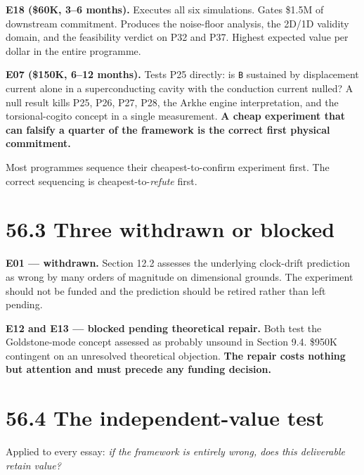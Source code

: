 \documentclass[
  11pt]{report}
\begin{document}
\textbf{E18 (\$60K, 3--6 months).} Executes all six simulations. Gates
\$1.5M of downstream commitment. Produces the noise-floor analysis, the
2D/1D validity domain, and the feasibility verdict on P32 and P37.
Highest expected value per dollar in the entire programme.

\textbf{E07 (\$150K, 6--12 months).} Tests P25 directly: is \texttt{B}
sustained by displacement current alone in a superconducting cavity with
the conduction current nulled? A null result kills P25, P26, P27, P28,
the Arkhe engine interpretation, and the torsional-cogito concept in a
single measurement. \textbf{A cheap experiment that can falsify a
quarter of the framework is the correct first physical commitment.}

Most programmes sequence their cheapest-to-confirm experiment first. The
correct sequencing is cheapest-to-\emph{refute} first.

\hypertarget{three-withdrawn-or-blocked}{%
\section{56.3 Three withdrawn or
blocked}\label{three-withdrawn-or-blocked}}

\textbf{E01 --- withdrawn.} Section 12.2 assesses the underlying
clock-drift prediction as wrong by many orders of magnitude on
dimensional grounds. The experiment should not be funded and the
prediction should be retired rather than left pending.

\textbf{E12 and E13 --- blocked pending theoretical repair.} Both test
the Goldstone-mode concept assessed as probably unsound in Section 9.4.
\$950K contingent on an unresolved theoretical objection. \textbf{The
repair costs nothing but attention and must precede any funding
decision.}

\hypertarget{the-independent-value-test}{%
\section{56.4 The independent-value
test}\label{the-independent-value-test}}

Applied to every essay: \emph{if the framework is entirely wrong, does
this deliverable retain value?}
\end{document}

